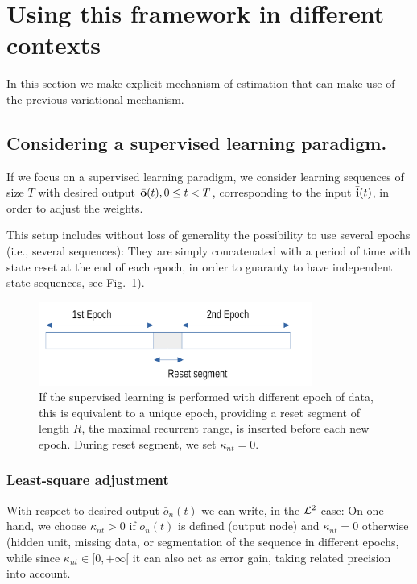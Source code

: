 \section{Using this framework in different contexts} \label{application}

In this section we make explicit mechanism of estimation that can make use of the previous variational mechanism. 

\subsection*{Considering a supervised learning paradigm.}

If we focus on a supervised learning paradigm, we consider learning sequences of size $T$ with desired output $\bar{\bf o}(t), 0 \le t < T$, corresponding to the input $\bar{\bf i}(t)$, in order to adjust the weights. 

This setup includes without loss of generality the possibility to use several epochs (i.e., several sequences): They are simply concatenated with a period of time with state reset at the end of each epoch, in order to guaranty to have independent state sequences, see Fig.~\ref{epoch-concatenation}).

\begin{figure}[!ht]
  \includegraphics[width=0.8\textwidth]{img/epoch-concatenation}
  \caption{If the supervised learning is performed with different epoch of data, this is equivalent to a unique epoch, providing a reset segment of length $R$, the maximal recurrent range, is inserted before each new epoch. During reset segment, we set $\kappa_{nt}  = 0$.}
  \label{epoch-concatenation}
\end{figure}

\subsubsection*{Least-square adjustment} With respect to desired output $\bar{o}_n(t)$ we can write, in the ${\cal L}^2$ case:
On one hand, we choose $\kappa_{nt} > 0$ if $\bar{o}_n(t)$ is defined (output node) and $\kappa_{nt} = 0$ otherwise (hidden unit, missing data, or segmentation of the sequence in different epochs, while since $\kappa_{nt} \in [0, +\infty[$ it can also act as error gain, taking related precision into account. 

